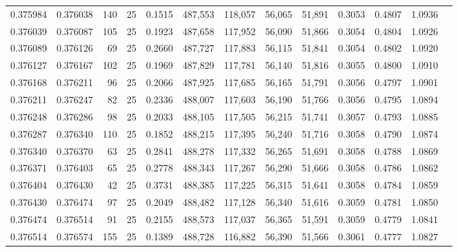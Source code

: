 \begin{tabular}{rrrrrrrrrrrrr}
0.375984 & 0.376038 &   140 &  25 &                                     0.1515 & 487,553 & 118,057 &  56,065 &  51,891 & 0.3053 & 0.4807 & 1.0936 \\
0.376039 & 0.376087 &   105 &  25 &                                     0.1923 & 487,658 & 117,952 &  56,090 &  51,866 & 0.3054 & 0.4804 & 1.0926 \\
0.376089 & 0.376126 &    69 &  25 &                                     0.2660 & 487,727 & 117,883 &  56,115 &  51,841 & 0.3054 & 0.4802 & 1.0920 \\
0.376127 & 0.376167 &   102 &  25 &                                     0.1969 & 487,829 & 117,781 &  56,140 &  51,816 & 0.3055 & 0.4800 & 1.0910 \\
0.376168 & 0.376211 &    96 &  25 &                                     0.2066 & 487,925 & 117,685 &  56,165 &  51,791 & 0.3056 & 0.4797 & 1.0901 \\
0.376211 & 0.376247 &    82 &  25 &                                     0.2336 & 488,007 & 117,603 &  56,190 &  51,766 & 0.3056 & 0.4795 & 1.0894 \\
0.376248 & 0.376286 &    98 &  25 &                                     0.2033 & 488,105 & 117,505 &  56,215 &  51,741 & 0.3057 & 0.4793 & 1.0885 \\
0.376287 & 0.376340 &   110 &  25 &                                     0.1852 & 488,215 & 117,395 &  56,240 &  51,716 & 0.3058 & 0.4790 & 1.0874 \\
0.376340 & 0.376370 &    63 &  25 &                                     0.2841 & 488,278 & 117,332 &  56,265 &  51,691 & 0.3058 & 0.4788 & 1.0869 \\
0.376371 & 0.376403 &    65 &  25 &                                     0.2778 & 488,343 & 117,267 &  56,290 &  51,666 & 0.3058 & 0.4786 & 1.0862 \\
0.376404 & 0.376430 &    42 &  25 &                                     0.3731 & 488,385 & 117,225 &  56,315 &  51,641 & 0.3058 & 0.4784 & 1.0859 \\
0.376430 & 0.376474 &    97 &  25 &                                     0.2049 & 488,482 & 117,128 &  56,340 &  51,616 & 0.3059 & 0.4781 & 1.0850 \\
0.376474 & 0.376514 &    91 &  25 &                                     0.2155 & 488,573 & 117,037 &  56,365 &  51,591 & 0.3059 & 0.4779 & 1.0841 \\
0.376514 & 0.376574 &   155 &  25 &                                     0.1389 & 488,728 & 116,882 &  56,390 &  51,566 & 0.3061 & 0.4777 & 1.0827 \\

\end{tabular}
